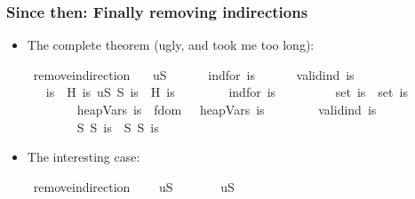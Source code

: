 \documentclass{beamer}
\begin{document}
\begin{frame}
\frametitle{Since then: Finally removing indirections}
\begin{itemize}
\item The complete theorem (ugly, and took me too long):
\begin{isabelle}
\isamarkupfalse%
\ remove{\isacharunderscore}indirection{\isacharprime}{\isacharcolon}\isanewline
\ \ {\isachardoublequoteopen}{\isasymGamma}\ {\isasymDown}\isactrlsup {\isasymsurd}\isactrlsup u\isactrlsup {\isasymtimes}\isactrlbsub S\isactrlesub \ {\isasymDelta}\ {\isasymLongrightarrow}\isanewline
\ \ \ \ ind{\isacharunderscore}for\ is\ {\isasymGamma}\ {\isasymLongrightarrow}\isanewline
\ \ \ \ valid{\isacharunderscore}ind\ is\ {\isasymLongrightarrow}\isanewline
\ \ {\isasymexists}\ is{\isacharprime}{\isachardot}\ {\isacharparenleft}{\isasymGamma}\ {\isasymominus}\isactrlsub H\ is\ {\isasymDown}\isactrlsup {\isasymtimes}\isactrlsup u\isactrlsup {\isasymtimes}\isactrlbsub S\ {\isasymominus}\isactrlsub S\ is\isactrlesub \ {\isasymDelta}\ {\isasymominus}\isactrlsub H\ is{\isacharprime}{\isacharparenright}\isanewline
\ \ \ \ \ \ \ {\isasymand}\ ind{\isacharunderscore}for\ is{\isacharprime}\ {\isasymDelta}\isanewline
\ \ \ \ \ \ \ {\isasymand}\ set\ is\ {\isasymsubseteq}\ set\ is{\isacharprime}\isanewline
\ \ \ \ \ \ \ {\isasymand}\ {\isacharparenleft}heapVars\ is{\isacharprime}\ {\isasyminter}\ fdom\ {\isasymGamma}{\isacharparenright}\ {\isasymsubseteq}\ heapVars\ is\isanewline
\ \ \ \ \ \ \ {\isasymand}\ valid{\isacharunderscore}ind\ is{\isacharprime}\isanewline
\ \ \ \ \ \ \ {\isasymand}\ S\ {\isasymominus}\isactrlsub S\ is{\isacharprime}\ {\isacharequal}\ S\ {\isasymominus}\isactrlsub S\ is{\isachardoublequoteclose}\isanewline
\end{isabelle}

\item The interesting case:
\begin{isabelle}
\isamarkupfalse%
\ remove{\isacharunderscore}indirection{\isacharcolon}\isanewline
\ \ \ {\isachardoublequoteopen}{\isasymGamma}\ {\isasymDown}\isactrlsup {\isasymsurd}\isactrlsup u\isactrlsup {\isasymtimes}\isactrlbsub S\isactrlesub \ {\isasymDelta}{\isachardoublequoteclose}\isanewline
\ \ \ {\isachardoublequoteopen}{\isasymexists}\ {\isasymDelta}{\isacharprime}{\isachardot}\ {\isasymGamma}\ {\isasymDown}\isactrlsup {\isasymtimes}\isactrlsup u\isactrlsup {\isasymtimes}\isactrlbsub S\isactrlesub \ {\isasymDelta}{\isacharprime}{\isachardoublequoteclose}
\end{isabelle}
\end{itemize}
\end{frame}
\end{document}
